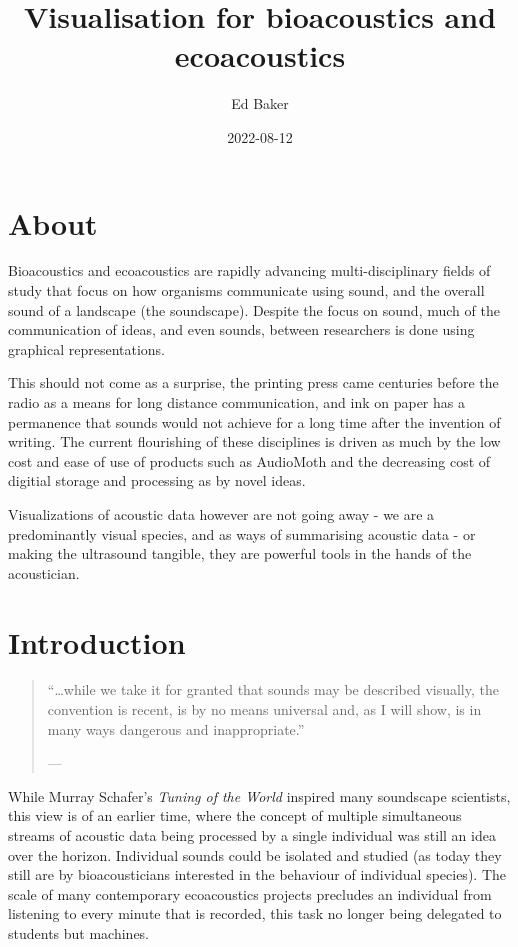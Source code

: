 \documentclass[
]{book}
\title{Visualisation for bioacoustics and ecoacoustics}
\author{Ed Baker}
\date{2022-08-12}
\begin{document}
\maketitle

{
\setcounter{tocdepth}{1}
\tableofcontents
}
\hypertarget{about}{%
\chapter*{About}\label{about}}

Bioacoustics and ecoacoustics are rapidly advancing multi-disciplinary fields of study that focus on how organisms communicate using sound, and the overall sound of a landscape (the soundscape). Despite the focus on sound, much of the communication of ideas, and even sounds, between researchers is done using graphical representations.

This should not come as a surprise, the printing press came centuries before the radio as a means for long distance communication, and ink on paper has a permanence that sounds would not achieve for a long time after the invention of writing. The current flourishing of these disciplines is driven as much by the low cost and ease of use of products such as AudioMoth and the decreasing cost of digitial storage and processing as by novel ideas.

Visualizations of acoustic data however are not going away - we are a predominantly visual species, and as ways of summarising acoustic data - or making the ultrasound tangible, they are powerful tools in the hands of the acoustician.

\hypertarget{intro}{%
\chapter{Introduction}\label{intro}}

\begin{quote}
``\ldots while we take it for granted that sounds may be described visually, the convention is recent, is by no means universal and, as I will show, is in many ways dangerous and inappropriate.''

\hfill --- \citet{schafer1977}
\end{quote}

While Murray Schafer's \emph{Tuning of the World} \citep{schafer1977} inspired many soundscape scientists, this view is of an earlier time, where the concept of multiple simultaneous streams of acoustic data being processed by a single individual was still an idea over the horizon. Individual sounds could be isolated and studied (as today they still are by bioacousticians interested in the behaviour of individual species). The scale of many contemporary ecoacoustics projects precludes an individual from listening to every minute that is recorded, this task no longer being delegated to students but machines.
\end{document}

